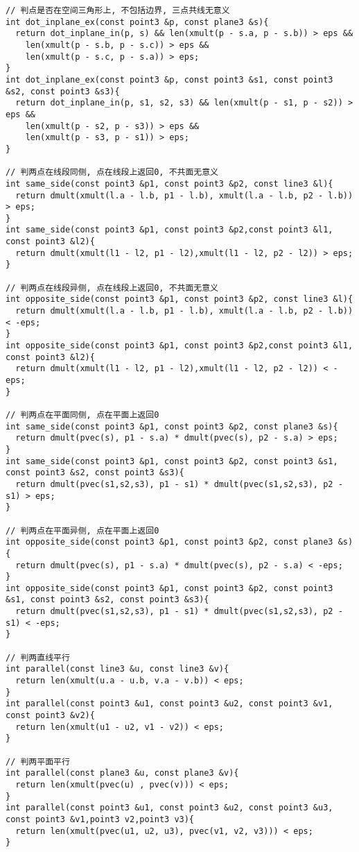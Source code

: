 \begin{lstlisting}[language={}]
// 判点是否在空间三角形上, 不包括边界, 三点共线无意义
int dot_inplane_ex(const point3 &p, const plane3 &s){
  return dot_inplane_in(p, s) && len(xmult(p - s.a, p - s.b)) > eps &&
    len(xmult(p - s.b, p - s.c)) > eps &&
    len(xmult(p - s.c, p - s.a)) > eps;
}
int dot_inplane_ex(const point3 &p, const point3 &s1, const point3 &s2, const point3 &s3){
  return dot_inplane_in(p, s1, s2, s3) && len(xmult(p - s1, p - s2)) > eps &&
    len(xmult(p - s2, p - s3)) > eps &&
    len(xmult(p - s3, p - s1)) > eps;
}

// 判两点在线段同侧, 点在线段上返回0, 不共面无意义
int same_side(const point3 &p1, const point3 &p2, const line3 &l){
  return dmult(xmult(l.a - l.b, p1 - l.b), xmult(l.a - l.b, p2 - l.b)) > eps;
}
int same_side(const point3 &p1, const point3 &p2,const point3 &l1, const point3 &l2){
  return dmult(xmult(l1 - l2, p1 - l2),xmult(l1 - l2, p2 - l2)) > eps;
}

// 判两点在线段异侧, 点在线段上返回0, 不共面无意义
int opposite_side(const point3 &p1, const point3 &p2, const line3 &l){
  return dmult(xmult(l.a - l.b, p1 - l.b), xmult(l.a - l.b, p2 - l.b)) < -eps;
}
int opposite_side(const point3 &p1, const point3 &p2,const point3 &l1, const point3 &l2){
  return dmult(xmult(l1 - l2, p1 - l2),xmult(l1 - l2, p2 - l2)) < -eps;
}

// 判两点在平面同侧, 点在平面上返回0
int same_side(const point3 &p1, const point3 &p2, const plane3 &s){
  return dmult(pvec(s), p1 - s.a) * dmult(pvec(s), p2 - s.a) > eps;
}
int same_side(const point3 &p1, const point3 &p2, const point3 &s1, const point3 &s2, const point3 &s3){
  return dmult(pvec(s1,s2,s3), p1 - s1) * dmult(pvec(s1,s2,s3), p2 - s1) > eps;
}

// 判两点在平面异侧, 点在平面上返回0
int opposite_side(const point3 &p1, const point3 &p2, const plane3 &s){
  return dmult(pvec(s), p1 - s.a) * dmult(pvec(s), p2 - s.a) < -eps;
}
int opposite_side(const point3 &p1, const point3 &p2, const point3 &s1, const point3 &s2, const point3 &s3){
  return dmult(pvec(s1,s2,s3), p1 - s1) * dmult(pvec(s1,s2,s3), p2 - s1) < -eps;
}

// 判两直线平行
int parallel(const line3 &u, const line3 &v){
  return len(xmult(u.a - u.b, v.a - v.b)) < eps;
}
int parallel(const point3 &u1, const point3 &u2, const point3 &v1, const point3 &v2){
  return len(xmult(u1 - u2, v1 - v2)) < eps;
}

// 判两平面平行
int parallel(const plane3 &u, const plane3 &v){
  return len(xmult(pvec(u) , pvec(v))) < eps;
}
int parallel(const point3 &u1, const point3 &u2, const point3 &u3, const point3 &v1,point3 v2,point3 v3){
  return len(xmult(pvec(u1, u2, u3), pvec(v1, v2, v3))) < eps;
}


\end{lstlisting}
